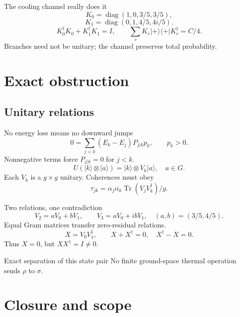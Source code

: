 \documentclass{beamer}
\begin{document}
\begin{frame}{The cooling channel really does it}
\[K_0=\operatorname{diag}(1,0,3/5,3/5),\]
 \[K_1=\operatorname{diag}(0,1,4/5,4i/5).\]
 \[K_0^\dagger K_0+K_1^\dagger K_1=I,\qquad
 \sum_r K_r|+\rangle\langle+|K_r^\dagger=C/4.\]
 Branches need not be unitary; the channel preserves total probability.
\end{frame}
\section{Exact obstruction}
\subsection{Unitary relations}
\begin{frame}{No energy loss means no downward jumps}
\[0=\sum_{j<k}(E_k-E_j)P_{j|k}p_k,\qquad p_k>0.\]
 Nonnegative terms force $P_{j|k}=0$ for $j<k$.
 \[U(|k\rangle\otimes|a\rangle)=|k\rangle\otimes V_k|a\rangle,\quad a\in G.\]
 Each $V_k$ is a $g\times g$ unitary. Coherences must obey
 \[\tau_{jk}=\alpha_j\overline{\alpha_k}\operatorname{Tr}(V_jV_k^\dagger)/g.\]
\end{frame}
\begin{frame}{Two relations, one contradiction}
\[V_2=aV_0+bV_1,\qquad V_3=aV_0+ibV_1,\quad(a,b)=(3/5,4/5).\]
 Equal Gram matrices transfer zero-residual relations.
 \[X=V_0V_1^\dagger,\qquad X+X^\dagger=0,\quad X^\dagger-X=0.\]
 Thus $X=0$, but $XX^\dagger=I\ne0$.
 \begin{block}{Exact separation of this state pair}
 No finite ground-space thermal operation sends $\rho$ to $\sigma$.
 \end{block}
\end{frame}
\section{Closure and scope}
\end{document}
